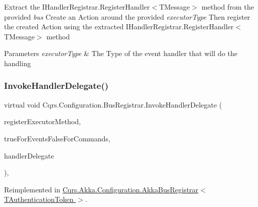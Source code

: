Extract the I\+Handler\+Registrar.\+Register\+Handler$<$\+T\+Message$>$ method from the provided {\itshape bus}  Create an Action around the provided {\itshape executor\+Type}  Then register the created Action using the extracted I\+Handler\+Registrar.\+Register\+Handler$<$\+T\+Message$>$ method 


\begin{DoxyParams}{Parameters}
{\em executor\+Type} & The Type of the event handler that will do the handling\\
\hline
\end{DoxyParams}
\mbox{\label{classCqrs_1_1Configuration_1_1BusRegistrar_a3103da4cf077104607fe03a862958827_a3103da4cf077104607fe03a862958827}} 
\subsubsection{\texorpdfstring{Invoke\+Handler\+Delegate()}{InvokeHandlerDelegate()}}
{\footnotesize\ttfamily virtual void Cqrs.\+Configuration.\+Bus\+Registrar.\+Invoke\+Handler\+Delegate (\begin{DoxyParamCaption}\item[{Method\+Info}]{register\+Executor\+Method,  }\item[{bool}]{true\+For\+Events\+False\+For\+Commands,  }\item[{\hyperlink{classCqrs_1_1Configuration_1_1HandlerDelegate}{Handler\+Delegate}}]{handler\+Delegate }\end{DoxyParamCaption})\hspace{0.3cm}{\ttfamily [protected]}, {\ttfamily [virtual]}}



Reimplemented in \hyperlink{classCqrs_1_1Akka_1_1Configuration_1_1AkkaBusRegistrar_a0ac474751b2ba8ebb27b885a15fbf053_a0ac474751b2ba8ebb27b885a15fbf053}{Cqrs.\+Akka.\+Configuration.\+Akka\+Bus\+Registrar$<$ T\+Authentication\+Token $>$}.

\mbox{\label{classCqrs_1_1Configuration_1_1BusRegistrar_ab8deb04dc9cb6b80f32b54c847dfb1b3_ab8deb04dc9cb6b80f32b54c847dfb1b3}} 
